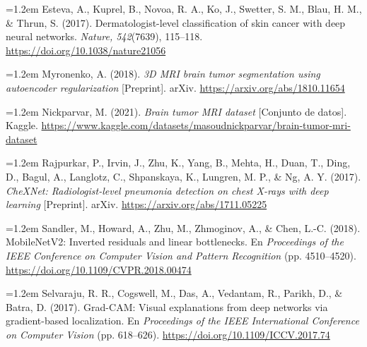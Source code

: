 \documentclass[10pt,letterpaper]{article}
\newcommand{\seccion}[1]{\par\vspace{3pt}{\small\bfseries #1}\par\vspace{0.5pt}}
\newcommand{\refapa}[1]{\par\hangindent=1.2em\hangafter=1 #1\par}
\begin{document}
\seccion{Referencias}
{\footnotesize
\refapa{Esteva, A., Kuprel, B., Novoa, R. A., Ko, J., Swetter, S. M., Blau, H. M., \& Thrun, S. (2017). Dermatologist-level classification of skin cancer with deep neural networks. \emph{Nature, 542}(7639), 115--118. \url{https://doi.org/10.1038/nature21056}}
\refapa{Myronenko, A. (2018). \emph{3D MRI brain tumor segmentation using autoencoder regularization} [Preprint]. arXiv. \url{https://arxiv.org/abs/1810.11654}}
\refapa{Nickparvar, M. (2021). \emph{Brain tumor MRI dataset} [Conjunto de datos]. Kaggle. \url{https://www.kaggle.com/datasets/masoudnickparvar/brain-tumor-mri-dataset}}
\refapa{Rajpurkar, P., Irvin, J., Zhu, K., Yang, B., Mehta, H., Duan, T., Ding, D., Bagul, A., Langlotz, C., Shpanskaya, K., Lungren, M. P., \& Ng, A. Y. (2017). \emph{CheXNet: Radiologist-level pneumonia detection on chest X-rays with deep learning} [Preprint]. arXiv. \url{https://arxiv.org/abs/1711.05225}}
\refapa{Sandler, M., Howard, A., Zhu, M., Zhmoginov, A., \& Chen, L.-C. (2018). MobileNetV2: Inverted residuals and linear bottlenecks. En \emph{Proceedings of the IEEE Conference on Computer Vision and Pattern Recognition} (pp. 4510--4520). \url{https://doi.org/10.1109/CVPR.2018.00474}}
\refapa{Selvaraju, R. R., Cogswell, M., Das, A., Vedantam, R., Parikh, D., \& Batra, D. (2017). Grad-CAM: Visual explanations from deep networks via gradient-based localization. En \emph{Proceedings of the IEEE International Conference on Computer Vision} (pp. 618--626). \url{https://doi.org/10.1109/ICCV.2017.74}}
}
\end{document}
